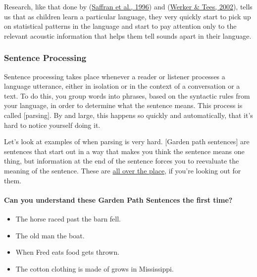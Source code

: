 \documentclass[
]{krantz}
\providecommand{\tightlist}{%
  \setlength{\itemsep}{0pt}\setlength{\parskip}{0pt}}
\begin{document}
Research, like that done by (\protect\hyperlink{ref-saffran1996}{Saffran et al., 1996}) and (\protect\hyperlink{ref-Werker2002}{Werker \& Tees, 2002}), tells us that as children learn a particular language, they very quickly start to pick up on statistical patterns in the language and start to pay attention only to the relevant acoustic information that helps them tell sounds apart in their language.

\hypertarget{sentence-processing}{%
\subsubsection*{Sentence Processing}\label{sentence-processing}}


Sentence processing takes place whenever a reader or listener processes a language utterance, either in isolation or in the context of a conversation or a text. To do this, you group words into phrases, based on the syntactic rules from your language, in order to determine what the sentence means. This process is called {[}parsing{]}. By and large, this happens so quickly and automatically, that it's hard to notice yourself doing it.

Let's look at examples of when parsing is very hard. {[}Garden path sentences{]} are sentences that start out in a way that makes you think the sentence means one thing, but information at the end of the sentence forces you to reevaluate the meaning of the sentence. These are \href{https://www.theguardian.com/world/2018/apr/10/spanish-politicians-urged-to-resign-over-fake-degree-claims}{all over the place}, if you're looking out for them.

\hypertarget{can-you-understand-these-garden-path-sentences-the-first-time}{%
\paragraph*{Can you understand these Garden Path Sentences the first time?}\label{can-you-understand-these-garden-path-sentences-the-first-time}}

\begin{itemize}
\tightlist
\item
  The horse raced past the barn fell.
\item
  The old man the boat.
\item
  When Fred eats food gets thrown.
\item
  The cotton clothing is made of grows in Mississippi.
\end{itemize}
\end{document}
